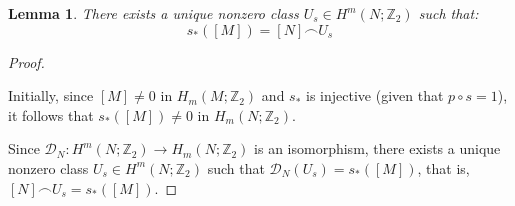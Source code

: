 \documentclass[12pt,oneside]{book}
\newtheorem{lem}    {Lemma}[chapter]
\newcommand{\Z}{\mathbb{Z}}
\newcommand{\ccap}{\frown}
\begin{document}
    \begin{lem}\label{lema_tecnico_dualidades_3}
    	There exists a unique nonzero class $U_{s}\in H^{m}(N;\Z_{2})$ such that:
    	$$ s_{*}([M])=[N]\ccap U_{s} $$
    \end{lem}
    \begin{proof}

        \

    	Initially, since $[M]\neq 0$ in $H_{m}(M;\Z_{2})$ and $s_{*}$ is injective (given that $p\circ s=1$), it follows that 
        $s_{*}([M])\neq 0$ in $H_{m}(N;\Z_{2})$.
    
    	Since $\mathcal{D}_{N}:H^{m}(N;\Z_{2})\to H_{m}(N;\Z_{2})$ is an isomorphism, there exists a unique nonzero class 
        $U_{s}\in H^{m}(N;\Z_{2})$ such that $\mathcal{D}_{N}(U_{s})=s_{*}([M])$, that is, $[N]\ccap U_{s}=s_{*}([M])$.
    
    \end{proof}
\end{document}
